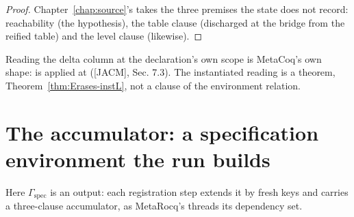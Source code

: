 \begin{proof}
\leanok
{}
 Chapter~\ref{chap:source}'s  takes the three premises the state does
not record: reachability (the hypothesis), the table clause (discharged at the bridge from the reified
table) and the level clause (likewise).
\end{proof}
\begin{remark}
 Reading the delta column at the declaration's own scope is MetaCoq's own shape:
 is applied at  ([JACM], Sec. 7.3). The instantiated
reading is a theorem, Theorem~\ref{thm:Erases-instL}, not a clause of the environment relation.
\end{remark}

\section{The accumulator: a specification environment the run builds}
\label{sec:coldstart:acc}

Here $\Gamma_{\mathrm{spec}}$ is an output: each registration step extends it by fresh keys and carries
a three-clause accumulator, as MetaRocq's  threads its dependency set.

